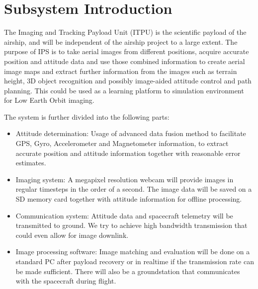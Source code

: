 \documentclass[fontsize=11pt,paper=a4,]{scrartcl}
\begin{document}
\sloppy



\pagestyle{plain}



\listoffigures
\newpage

\listoftables
\newpage

\tableofcontents
\newpage
\acresetall	%
\clearpage %
\pagestyle{fancy}




\section{Subsystem Introduction}
The Imaging and Tracking Payload Unit (ITPU) is the scientific payload of the airship, and will be independent of the airship project to a large extent.
The purpose of IPS is to take aerial images from different positions, acquire accurate position and attitude data and use those combined information to create aerial image maps and extract further information from the images such as terrain height, 3D object recognition and possibly image-aided attitude control and path planning.
This could be used as a learning platform to simulation environment for Low Earth Orbit imaging.

The system is further divided into the following parts:
\begin{itemize}
\item Attitude determination: Usage of advanced data fusion method to facilitate GPS, Gyro, Accelerometer and Magnetometer information, to extract accurate position and attitude information together with reasonable error estimates.
\item Imaging system: A megapixel resolution webcam will provide images in regular timesteps in the order of a second.
The image data will be saved on a SD memory card together with attitude information for offline processing.
\item Communication system: Attitude data and spacecraft telemetry will be transmitted to ground.
We try to achieve high bandwidth transmission that could even allow for image downlink.
\item Image processing software:
Image matching and evaluation will be done on a standard PC after payload recovery or in realtime if the transmission rate can be made sufficient.
There will also be a groundstation that communicates with the spacecraft during flight.
\end{itemize}
\end{document}
